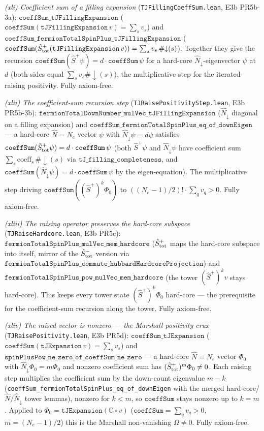 \documentclass[a4paper,11pt]{article}
\begin{document}
\emph{(xli) Coefficient sum of a filling expansion} (\texttt{TJFillingCoeffSum.lean}, E3b PR5b-3a):
$\texttt{coeffSum\_tJFillingExpansion}$ ($\texttt{coeffSum}(\texttt{tJFillingExpansion}\,v)=\sum_s
v_s$) and $\texttt{coeffSum\_fermionTotalSpinPlus\_tJFillingExpansion}$
($\texttt{coeffSum}(\hat S^+_{\rm tot}(\texttt{tJFillingExpansion}\,v))=\sum_s v_s\,\#{\downarrow}(s)$).
Together they give the recursion $\texttt{coeffSum}(\hat S^+\psi)=d\cdot\texttt{coeffSum}\,\psi$ for a
hard-core $\hat N_\downarrow$-eigenvector $\psi$ at $d$ (both sides equal $\sum_s v_s\#{\downarrow}(s)$),
the multiplicative step for the iterated-raising positivity.  Fully axiom-free.

\emph{(xlii) The coefficient-sum recursion step} (\texttt{TJRaisePositivityStep.lean}, E3b PR5b-3b):
$\texttt{fermionTotalDownNumber\_mulVec\_tJFillingExpansion}$ ($\hat N_\downarrow$ diagonal on a filling
expansion) and $\texttt{coeffSum\_fermionTotalSpinPlus\_eq\_of\_downEigen}$ --- a hard-core $\hat
N=N_e$ vector $\psi$ with $\hat N_\downarrow\psi=d\psi$ satisfies $\texttt{coeffSum}(\hat
S^+_{\rm tot}\psi)=d\cdot\texttt{coeffSum}\,\psi$ (both $\hat S^+\psi$ and $\hat N_\downarrow\psi$ have
coefficient sum $\sum_s\text{coeff}_s\,\#{\downarrow}(s)$ via $\texttt{tJ\_filling\_completeness}$, and
$\texttt{coeffSum}(\hat N_\downarrow\psi)=d\cdot\texttt{coeffSum}\,\psi$ by the eigen-equation).  The
multiplicative step driving $\texttt{coeffSum}((\hat S^+)^k\Phi_0)$ to $((N_e-1)/2)!\cdot\sum_q v_q>0$.
Fully axiom-free.

\emph{(xliii) The raising operator preserves the hard-core subspace} (\texttt{TJRaiseHardcore.lean},
E3b PR5c): $\texttt{fermionTotalSpinPlus\_mulVec\_mem\_hardcore}$ ($\hat S^+_{\rm tot}$ maps the
hard-core subspace into itself, mirror of the $\hat S^-_{\rm tot}$ version via
$\texttt{fermionTotalSpinPlus\_commute\_hubbardHardcoreProjection}$) and
$\texttt{fermionTotalSpinPlus\_pow\_mulVec\_mem\_hardcore}$ (the tower $(\hat S^+)^k v$ stays
hard-core).  This keeps every tower state $(\hat S^+)^k\Phi_0$ hard-core --- the prerequisite for the
coefficient-sum recursion along the tower.  Fully axiom-free.

\emph{(xliv) The raised vector is nonzero --- the Marshall positivity crux}
(\texttt{TJRaisePositivity.lean}, E3b PR5d): $\texttt{coeffSum\_tJExpansion}$
($\texttt{coeffSum}(\texttt{tJExpansion}\,v)=\sum_s v_s$) and
$\texttt{spinPlusPow\_ne\_zero\_of\_coeffSum\_ne\_zero}$ --- a hard-core $\hat N=N_e$ vector $\Phi_0$
with $\hat N_\downarrow\Phi_0=m\Phi_0$ and nonzero coefficient sum has $(\hat S^+_{\rm tot})^m\Phi_0
\neq 0$.  Each raising step multiplies the coefficient sum by the down-count eigenvalue $m-k$
(\texttt{coeffSum\_fermionTotalSpinPlus\_eq\_of\_downEigen} with the merged hard-core/$\hat N$/$\hat
N_\downarrow$ tower lemmas), nonzero for $k<m$, so $\texttt{coeffSum}$ stays nonzero up to $k=m$.
Applied to $\Phi_0=\texttt{tJExpansion}(\mathbb C\circ v)$ ($\texttt{coeffSum}=\sum_q v_q>0$,
$m=(N_e-1)/2$) this is the Marshall non-vanishing $\Omega\neq 0$.  Fully axiom-free.
\end{document}
